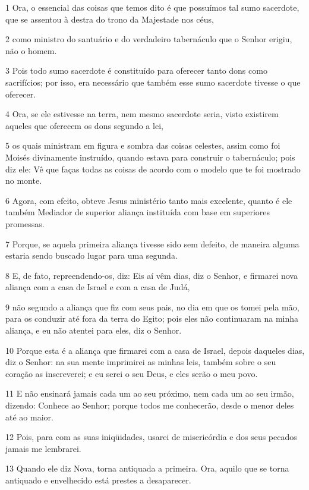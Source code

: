 \par 1 Ora, o essencial das coisas que temos dito é que possuímos tal sumo sacerdote, que se assentou à destra do trono da Majestade nos céus,
\par 2 como ministro do santuário e do verdadeiro tabernáculo que o Senhor erigiu, não o homem.
\par 3 Pois todo sumo sacerdote é constituído para oferecer tanto dons como sacrifícios; por isso, era necessário que também esse sumo sacerdote tivesse o que oferecer.
\par 4 Ora, se ele estivesse na terra, nem mesmo sacerdote seria, visto existirem aqueles que oferecem os dons segundo a lei,
\par 5 os quais ministram em figura e sombra das coisas celestes, assim como foi Moisés divinamente instruído, quando estava para construir o tabernáculo; pois diz ele: Vê que faças todas as coisas de acordo com o modelo que te foi mostrado no monte.
\par 6 Agora, com efeito, obteve Jesus ministério tanto mais excelente, quanto é ele também Mediador de superior aliança instituída com base em superiores promessas.
\par 7 Porque, se aquela primeira aliança tivesse sido sem defeito, de maneira alguma estaria sendo buscado lugar para uma segunda.
\par 8 E, de fato, repreendendo-os, diz: Eis aí vêm dias, diz o Senhor, e firmarei nova aliança com a casa de Israel e com a casa de Judá,
\par 9 não segundo a aliança que fiz com seus pais, no dia em que os tomei pela mão, para os conduzir até fora da terra do Egito; pois eles não continuaram na minha aliança, e eu não atentei para eles, diz o Senhor.
\par 10 Porque esta é a aliança que firmarei com a casa de Israel, depois daqueles dias, diz o Senhor: na sua mente imprimirei as minhas leis, também sobre o seu coração as inscreverei; e eu serei o seu Deus, e eles serão o meu povo.
\par 11 E não ensinará jamais cada um ao seu próximo, nem cada um ao seu irmão, dizendo: Conhece ao Senhor; porque todos me conhecerão, desde o menor deles até ao maior.
\par 12 Pois, para com as suas iniqüidades, usarei de misericórdia e dos seus pecados jamais me lembrarei.
\par 13 Quando ele diz Nova, torna antiquada a primeira. Ora, aquilo que se torna antiquado e envelhecido está prestes a desaparecer.

